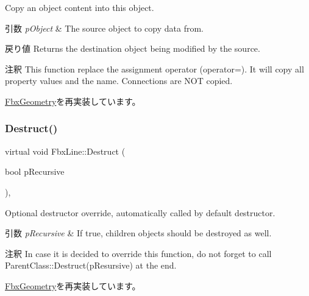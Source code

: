 Copy an object content into this object. 
\begin{DoxyParams}{引数}
{\em p\+Object} & The source object to copy data from. \\
\hline
\end{DoxyParams}
\begin{DoxyReturn}{戻り値}
Returns the destination object being modified by the source. 
\end{DoxyReturn}
\begin{DoxyRemark}{注釈}
This function replace the assignment operator (operator=). It will copy all property values and the name. Connections are N\+OT copied. 
\end{DoxyRemark}


\hyperlink{class_fbx_geometry_aac1cee4251e3d5fbd27f1181c58b83b3}{Fbx\+Geometry}を再実装しています。

\mbox{\label{class_fbx_line_a92abd64f6b58057c899bf5733a2e2275}} 
\subsubsection{\texorpdfstring{Destruct()}{Destruct()}}
{\footnotesize\ttfamily virtual void Fbx\+Line\+::\+Destruct (\begin{DoxyParamCaption}\item[{bool}]{p\+Recursive }\end{DoxyParamCaption})\hspace{0.3cm}{\ttfamily [protected]}, {\ttfamily [virtual]}}

Optional destructor override, automatically called by default destructor. 
\begin{DoxyParams}{引数}
{\em p\+Recursive} & If true, children objects should be destroyed as well. \\
\hline
\end{DoxyParams}
\begin{DoxyRemark}{注釈}
In case it is decided to override this function, do not forget to call Parent\+Class\+::\+Destruct(p\+Resursive) at the end. 
\end{DoxyRemark}


\hyperlink{class_fbx_geometry_a07e94f7801067d66429afbf1799795cd}{Fbx\+Geometry}を再実装しています。

\mbox{\label{class_fbx_line_a3307097464d924b2c95c6687e41d69c9}} 
